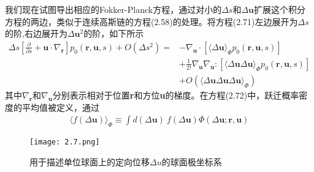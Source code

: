 \documentclass[12pt]{article}
\begin{document}
\begin{CJK}{UTF8}{gkai}
我们现在试图导出相应的Fokker-Planck方程，通过对小的$\Delta s$和$\Delta \textbf{u}$扩展这个积分方程的两边，类似于连续高斯链的方程(2.58)的处理。将方程(2.71)左边展开为$\Delta s$的阶,右边展开为$\Delta \textbf{u}^2$的阶，如下所示\\
\begin{equation}
\begin{aligned}
\Delta s \left[\frac{\partial}{\partial s}+\textbf{u}\cdot\nabla_\textbf{r}\right]p_0(\textbf{r},\textbf{u},s)+O(\Delta s^2)=&-\nabla_\textbf{u} \cdot [\langle \Delta \textbf{u}\rangle_\Phi p_0(\textbf{r},\textbf{u},s)]\\&+\frac{1}{2!}\nabla_\textbf{u} \nabla_\textbf{u} :[\langle\Delta \textbf{u}\Delta \textbf{u} \rangle_\Phi p_0(\textbf{r},\textbf{u},s)]\\&+O(\langle \Delta \textbf{u} \Delta \textbf{u}\Delta \textbf{u}\rangle_\Phi)
\end{aligned}
\end{equation}
其中$\nabla_\textbf{r}$和$\nabla_\textbf{u}$分别表示相对于位置\textbf{r}和方位\textbf{u}的梯度。在方程(2.72)中，跃迁概率密度的平均值被定义，通过
\begin{gather}
\langle f(\Delta \textbf{u})\rangle _\Phi\equiv\int d(\Delta \textbf{u})\ f(\Delta \textbf{u} )\Phi(\Delta \textbf{u};\textbf{r},\textbf{u})
\end{gather}
 \begin{figure}[H]
	\centering   
	\texttt{[image: 2.7.png]}
	\caption{用于描述单位球面上的定向位移$\Delta u$的球面极坐标系}
\end{figure}


\end{CJK}
\end{document}
